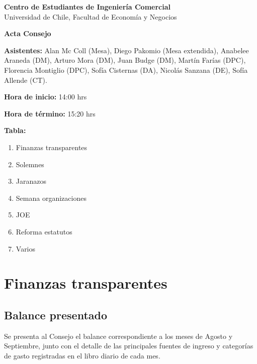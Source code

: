 \documentclass[12pt,letterpaper]{article}
\begin{document}
\begin{center}
  {\Large\bfseries Centro de Estudiantes de Ingeniería Comercial}\\
  Universidad de Chile, Facultad de Economía y Negocios

  \vspace{1.2em}
  \textbf{Acta Consejo}
\end{center}

\vspace{0.8em}

\textbf{Asistentes:} Alan Mc Coll (Mesa), Diego Pakomio (Mesa extendida), Anabelee Araneda (DM), Arturo Mora (DM), Juan Budge (DM), Martín Farías (DPC), Florencia Montiglio (DPC), Sofía Cisternas (DA), Nicolás Sanzana (DE), Sofía Allende (CT).

\textbf{Hora de inicio:} 14:00 hrs

\textbf{Hora de término:} 15:20 hrs

\vspace{1em}

\textbf{Tabla:}

\begin{enumerate}[itemsep=6pt]
  \item Finanzas transparentes
  \item Solemnes
  \item Jaranazos
  \item Semana organizaciones
  \item JOE
  \item Reforma estatutos
  \item Varios
\end{enumerate}

\section{Finanzas transparentes}

\subsection{Balance presentado}

Se presenta al Consejo el balance correspondiente a los meses de Agosto y Septiembre, junto con el detalle de las principales fuentes de ingreso y categorías de gasto registradas en el libro diario de cada mes.
\end{document}
